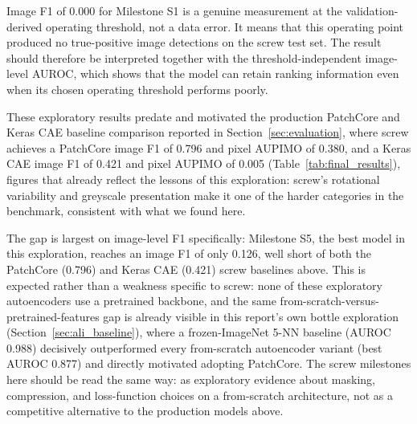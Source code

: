 \begin{table}[h]
\centering
\caption{Screw-category results across the exploratory autoencoder variants.}
\label{tab:screw-results}
\end{table}

Image F1 of 0.000 for Milestone S1 is a genuine measurement at the
validation-derived operating threshold, not a data error. It means that this
operating point produced no true-positive image detections on the screw test
set. The result should therefore be interpreted together with the
threshold-independent image-level AUROC, which shows that the model can retain
ranking information even when its chosen operating threshold performs poorly.

These exploratory results predate and motivated the production PatchCore and
Keras CAE baseline comparison reported in Section~\ref{sec:evaluation}, where screw achieves a
PatchCore image F1 of 0.796 and pixel AUPIMO of 0.380, and a Keras CAE image
F1 of 0.421 and pixel AUPIMO of 0.005 (Table~\ref{tab:final_results}), figures that already reflect
the lessons of this exploration: screw's rotational variability and greyscale
presentation make it one of the harder categories in the benchmark,
consistent with what we found here.

The gap is largest on image-level F1 specifically: Milestone S5, the best
model in this exploration, reaches an image F1 of only 0.126, well short of
both the PatchCore (0.796) and Keras CAE (0.421) screw baselines above. This
is expected rather than a weakness specific to screw: none of these
exploratory autoencoders use a pretrained backbone, and the same
from-scratch-versus-pretrained-features gap is already visible in this
report's own bottle exploration (Section~\ref{sec:ali_baseline}), where a frozen-ImageNet
5-NN baseline (AUROC 0.988) decisively outperformed every from-scratch
autoencoder variant (best AUROC 0.877) and directly motivated adopting
PatchCore. The screw milestones here should be read the same way: as
exploratory evidence about masking, compression, and loss-function choices
on a from-scratch architecture, not as a competitive alternative to the
production models above.
